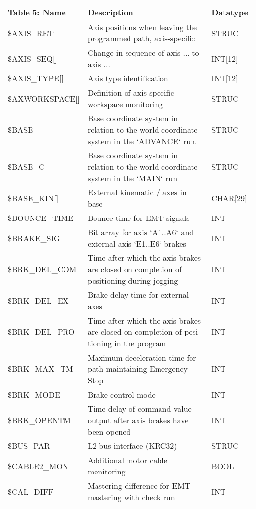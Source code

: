 \begin{appendices}
        \newpage
        \begin{tabular}{|p{}|p{}|p{}|}
        \hline
        \textbf{Table 5: Name} & \textbf{Description} & \textbf{Datatype} \\ \hline
        \$AXIS\_RET & Axis positions when leaving the programmed path, axis-specific & STRUC \\ \hline
        \$AXIS\_SEQ[] & Change in sequence of axis ... to axis ... & INT[12] \\ \hline
        \$AXIS\_TYPE[] & Axis type identification & INT[12] \\ \hline
        \$AXWORKSPACE[] & Definition of axis-specific workspace monitoring & STRUC \\ \hline
        \$BASE & Base coordinate system in relation to the world coordinate system in the `ADVANCE` run. & STRUC \\ \hline
        \$BASE\_C & Base coordinate system in relation to the world coordinate system in the `MAIN` run & STRUC \\ \hline
        \$BASE\_KIN[] & External kinematic / axes in base & CHAR[29] \\ \hline
        \$BOUNCE\_TIME & Bounce time for EMT signals & INT \\ \hline
        \$BRAKE\_SIG & Bit array for axis `A1..A6` and external axis `E1..E6` brakes & INT \\ \hline
        \$BRK\_DEL\_COM & Time after which the axis brakes are closed on completion of positioning during jogging & INT \\ \hline
        \$BRK\_DEL\_EX & Brake delay time for external axes & INT \\ \hline
        \$BRK\_DEL\_PRO & Time after which the axis brakes are closed on completion of posi- tioning in the program & INT \\ \hline
        \$BRK\_MAX\_TM & Maximum deceleration time for path-maintaining Emergency Stop & INT \\ \hline
        \$BRK\_MODE & Brake control mode & INT \\ \hline
        \$BRK\_OPENTM & Time delay of command value output after axis brakes have been opened & INT \\ \hline
        \$BUS\_PAR & L2 bus interface (KRC32) & STRUC \\ \hline
        \$CABLE2\_MON & Additional motor cable monitoring & BOOL \\ \hline
        \$CAL\_DIFF & Mastering difference for EMT mastering with check run & INT \\ \hline
        \end{tabular}
        

\end{appendices}
